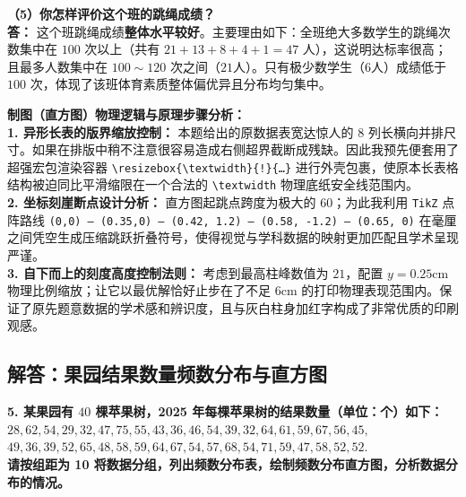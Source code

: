 \vspace{0.4cm}

\textbf{（5）你怎样评价这个班的跳绳成绩？} \\
\textbf{答：} 这个班跳绳成绩\textbf{整体水平较好}。主要理由如下：全班绝大多数学生的跳绳次数集中在 $100$ 次以上（共有 $21+13+8+4+1 = 47$ 人），这说明达标率很高；且最多人数集中在 $100 \sim 120$ 次之间（$21$人）。只有极少数学生（$6$人）成绩低于 $100$ 次，体现了该班体育素质整体偏优异且分布均匀集中。

\vspace{0.6cm}

{\small\color{blue!70!black}
\textbf{制图（直方图）物理逻辑与原理步骤分析：}\\
\textbf{1. 异形长表的版界缩放控制：} 本题给出的原数据表宽达惊人的 $8$ 列长横向并排尺寸。如果在排版中稍不注意很容易造成右侧超界截断成残缺。因此我预先便套用了超强宏包渲染容器 \texttt{\textbackslash resizebox\{\textbackslash textwidth\}\{!\}\{\dots\}} 进行外壳包裹，使原本长表格结构被迫同比平滑缩限在一个合法的 \texttt{\textbackslash textwidth} 物理底纸安全线范围内。\\
\textbf{2. 坐标刻崖断点设计分析：} 直方图起跳点跨度为极大的 $60$；为此我利用 \texttt{TikZ} 点阵路线 \texttt{(0,0) -- (0.35,0) -- (0.42, 1.2) -- (0.58, -1.2) -- (0.65, 0)} 在毫厘之间凭空生成压缩跳跃折叠符号，使得视觉与学科数据的映射更加匹配且学术呈现严谨。\\
\textbf{3. 自下而上的刻度高度控制法则：} 考虑到最高柱峰数值为 $21$，配置 $y=0.25\text{cm}$ 物理比例缩放；让它以最优解恰好止步在了不足 $6\text{cm}$ 的打印物理表现范围内。保证了原先题意数据的学术感和辨识度，且与灰白柱身加红字构成了非常优质的印刷观感。
}

\newpage

\newpage

\subsection{解答：果园结果数量频数分布与直方图}

\vspace{0.6cm}

\textbf{5. 某果园有 $40$ 棵苹果树，2025 年每棵苹果树的结果数量（单位：个）如下：\\
$28, 62, 54, 29, 32, 47, 75, 55, 43, 36, 46, 54, 39, 32, 64, 61, 59, 67, 56, 45,$ \\
$49, 36, 39, 52, 65, 48, 58, 59, 64, 67, 54, 57, 68, 54, 71, 59, 47, 58, 52, 52.$ \\
请按组距为 10 将数据分组，列出频数分布表，绘制频数分布直方图，分析数据分布的情况。}

